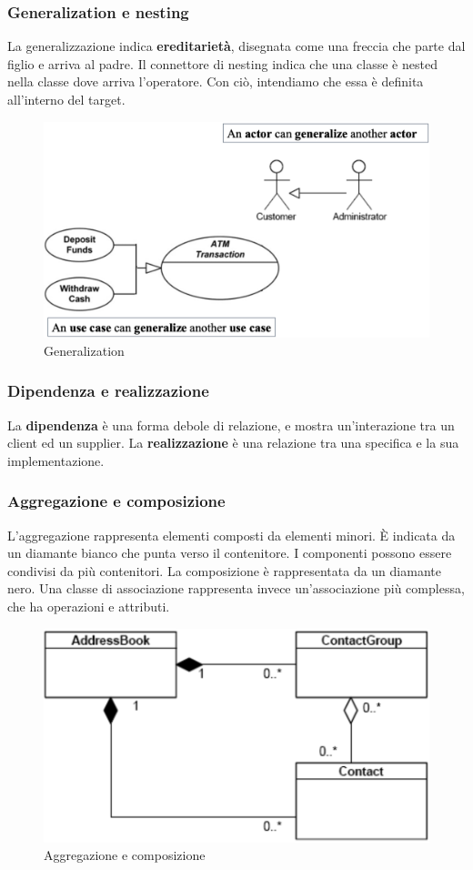 \documentclass[11pt]{article}
\begin{document}
\subsubsection{Generalization e nesting}
La generalizzazione indica \textbf{ereditarietà}, disegnata come una freccia che parte dal figlio e arriva al padre. Il connettore di nesting indica che una classe è nested nella classe dove arriva l'operatore. Con ciò, intendiamo che essa è definita all'interno del target. 
\begin{figure}[H]
    \centering
    \includegraphics[width=0.6\linewidth]{res/teoria/Generalization.png}
    \caption{Generalization}
\end{figure}
\subsubsection{Dipendenza e realizzazione}
La \textbf{dipendenza} è una forma debole di relazione, e mostra un'interazione tra un client ed un supplier. La \textbf{realizzazione} è una relazione tra una specifica e la sua implementazione. 
\subsubsection{Aggregazione e composizione}
L'aggregazione rappresenta elementi composti da elementi minori. È indicata da un diamante bianco che punta verso il contenitore. I componenti possono essere condivisi da più contenitori. La composizione è rappresentata da un diamante nero. Una classe di associazione rappresenta invece un'associazione più complessa, che ha operazioni e attributi.
\begin{figure}[H]
    \centering
    \includegraphics[width=0.6\linewidth]{res/teoria/AggrComposition.png}
    \caption{Aggregazione e composizione}
\end{figure}
\end{document}
